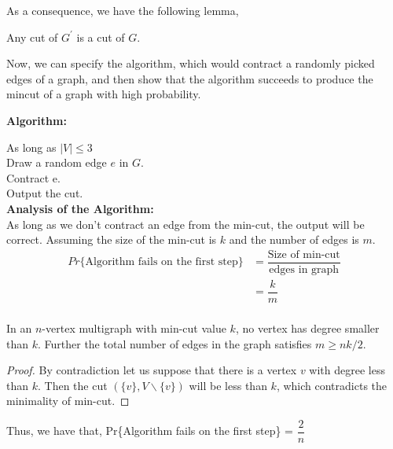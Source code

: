 As a consequence, we have the following lemma,\\
\begin{lemma}
 Any cut of $G^{\prime}$ is a cut of $G$.
\end{lemma}
Now, we can specify the algorithm, which would contract a randomly picked edges of a graph, and 
then show that the algorithm succeeds to produce the mincut of a graph with high probability.

\noindent \textbf{Algorithm:}

\indent \hspace{5pt} As long as $|V| \leq 3$\\
\indent \indent \hspace{5pt} Draw a random edge $e$ in $G$.\\
\indent \indent \hspace{5pt} Contract e.\\
\indent \hspace{5pt} Output the cut. \\

\noindent \textbf{Analysis of the Algorithm:}\\
As long as we don't contract an edge from the min-cut, the output will be correct. Assuming the size
of the min-cut is $k$ and the number of edges is $m$.\\
\begin{equation*}
  \begin{array}{ll}
	 Pr\{\mbox{Algorithm fails on the first step}\}& = \dfrac{\mbox{Size of min-cut}}{\mbox{edges in graph}}\\
	 & = \dfrac{k}{m}\\
  \end{array}
\end{equation*}

\begin{lemma}
 In an $n$-vertex multigraph with min-cut value $k$, no vertex has degree smaller than $k$. Further 
the total number of edges in the graph satisfies $m\geq nk/2$.
\end{lemma}
\begin{proof}
 By contradiction let us suppose that there is a vertex $v$ with degree less than $k$. Then the cut 
$(\{v\},V\backslash \{v\})$ will be less than $k$, which contradicts the minimality of min-cut.
\end{proof}

\noindent Thus, we have that, Pr\{Algorithm fails on the first step\} = $\dfrac{2}{n}$

